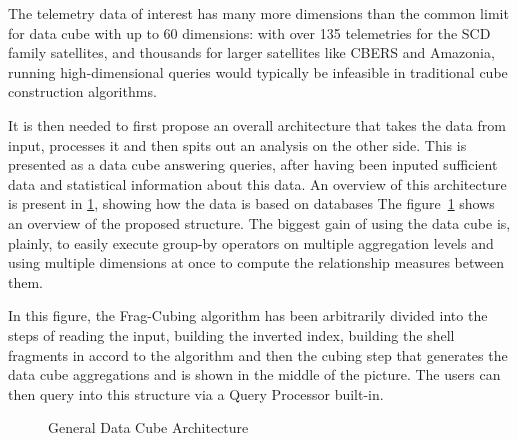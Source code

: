 The telemetry data of interest has many more dimensions than the common limit for data cube with up to 60 dimensions: with over 135 telemetries for the SCD family satellites, and thousands for larger satellites like CBERS and Amazonia, running high-dimensional queries would typically be infeasible in traditional cube construction algorithms.

It is then needed to first propose an overall architecture that takes the data from input, processes it and then spits out an analysis on the other side.
This is presented as a data cube answering queries, after having been inputed sufficient data and statistical information about this data.
An overview of this architecture is present in \ref{fig:architecture_static}, showing how the data is based on databases
The figure~\ref{fig:architecture_static} shows an overview of the proposed structure.
The biggest gain of using the data cube is, plainly, to easily execute group-by operators on multiple aggregation levels and using multiple dimensions at once to compute the relationship measures between them.

In this figure, the Frag-Cubing algorithm has been arbitrarily divided into the steps of reading the input, building the inverted index, building the shell fragments in accord to the algorithm and then the cubing step that generates the data cube aggregations and is shown in the middle of the picture.
The users can then query into this structure via a Query Processor built-in.

\begin{figure}[!htb]
  \caption{General Data Cube Architecture}\label{fig:architecture_static}
  \vspace{2mm}
  \begin{center}
  \end{center}
  \vspace{1mm}
\end{figure}

